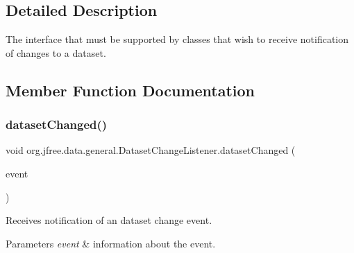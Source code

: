 \subsection{Detailed Description}
The interface that must be supported by classes that wish to receive notification of changes to a dataset. 

\subsection{Member Function Documentation}
\mbox{\label{interfaceorg_1_1jfree_1_1data_1_1general_1_1_dataset_change_listener_a26ca53969f0dfa539f52e846a3cd72fe}} 
\subsubsection{\texorpdfstring{dataset\+Changed()}{datasetChanged()}}
{\footnotesize\ttfamily void org.\+jfree.\+data.\+general.\+Dataset\+Change\+Listener.\+dataset\+Changed (\begin{DoxyParamCaption}\item[{\mbox{\hyperlink{classorg_1_1jfree_1_1data_1_1general_1_1_dataset_change_event}{Dataset\+Change\+Event}}}]{event }\end{DoxyParamCaption})}

Receives notification of an dataset change event.


\begin{DoxyParams}{Parameters}
{\em event} & information about the event. \\
\hline
\end{DoxyParams}


